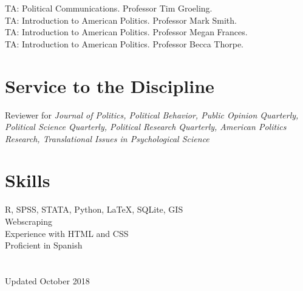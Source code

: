 \documentclass[11pt, a4paper]{article}
\newcommand{\years}[1]{\marginnote{\scriptsize #1}}
\begin{document}
\years{2018} TA: Political Communications. Professor Tim Groeling.\\
\years{2015} TA: Introduction to American Politics. Professor Mark Smith.\\
\years{} TA: Introduction to American Politics. Professor Megan Frances.\\
\years{2014} TA: Introduction to American Politics. Professor Becca Thorpe.

\section*{Service to the Discipline}

Reviewer for \textit{Journal of Politics, Political Behavior, Public Opinion Quarterly, Political Science Quarterly, Political Research Quarterly, American Politics Research, Translational Issues in Psychological Science}

\section*{Skills}

R, SPSS, STATA, Python, \LaTeX, SQLite, GIS\\
Webscraping\\
Experience with HTML and CSS\\
Proficient in Spanish\\
\\
\\
Updated October 2018
\end{document}
